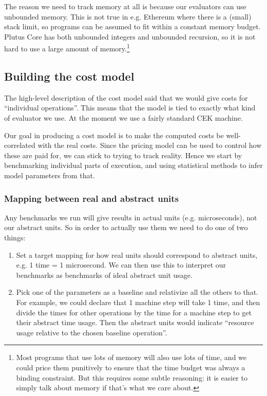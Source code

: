 The reason we need to track memory at all is because our evaluators can use unbounded memory.
This is not true in e.g. Ethereum where there is a (small) stack limit, so programs can be assumed to fit within a constant memory budget.
Plutus Core has both unbounded integers and unbounded recursion, so it is not hard to use a large amount of memory.\footnote{
Most programs that use lots of memory will also use lots of time, and we could price them punitively to ensure that the time budget was always a binding constraint.
But this requires some subtle reasoning: it is easier to simply talk about memory if that's what we care about.
}

\subsection{Building the cost model}
The high-level description of the cost model said that we would give costs for ``individual operations''.
This means that the model is tied to exactly what kind of evaluator we use.
At the moment we use a fairly standard CEK machine.


Our goal in producing a cost model is to make the computed costs be well-correlated with the real costs.
Since the pricing model can be used to control how these are paid for, we can stick to trying to track reality.
Hence we start by benchmarking individual parts of execution, and using statistical methods to infer model parameters from that.

\subsubsection{Mapping between real and abstract units}
Any benchmarks we run will give results in actual units (e.g. microseconds), not our abstract units.
So in order to actually use them we need to do one of two things:
\begin{enumerate}
\item
  Set a target mapping for how real units should correspond to abstract units, e.g. 1 \gls{time} = 1 microsecond.
  We can then use this to interpret our benchmarks as benchmarks of ideal abstract unit usage.
\item
  Pick one of the parameters as a baseline and relativize all the others to that.
  For example, we could declare that 1 machine step will take 1 \gls{time}, and then divide the times for other operations by the time for a machine step to get their abstract \gls{time} usage.
  Then the abstract units would indicate ``resource usage relative to the chosen baseline operation''.
\end{enumerate}

